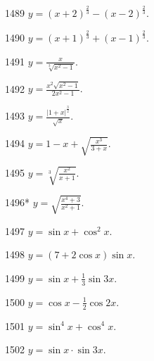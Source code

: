 \begin{prob}[S]{1489}
$y = (x+2)^{\frac{2}{3}} - (x-2)^{\frac{2}{3}}.$
\end{prob}

\begin{prob}[S]{1490}
$y = (x+1)^{\frac{2}{3}} + (x-1)^{\frac{2}{3}}.$
\end{prob}

\begin{prob}[S]{1491}
$y = \frac{x}{\sqrt[3]{x^2 - 1}}.$
\end{prob}

\begin{prob}[S]{1492}
$y = \frac{x^2\sqrt{x^2 - 1}}{2x^2 - 1}.$
\end{prob}

\begin{prob}[S]{1493}
$y = \frac{|1+x|^{\frac{3}{2}}}{\sqrt{x}}.$
\end{prob}

\begin{prob}[S]{1494}
$y = 1 - x + \sqrt{\frac{x^3}{3+x}}.$
\end{prob}

\begin{prob}[S]{1495}
$y = \sqrt[3]{\frac{x^2}{x+1}}.$
\end{prob}

\begin{prob}[S]{1496*}
$y = \sqrt{\frac{x^4 + 3}{x^2 + 1}}.$
\end{prob}

\begin{prob}[S]{1497}
$y = \sin x + \cos^2 x.$
\end{prob}

\begin{prob}[S]{1498}
$y = (7 + 2\cos x)\sin x.$
\end{prob}

\begin{prob}[S]{1499}
$y = \sin x + \frac{1}{3}\sin 3x.$
\end{prob}

\begin{prob}[S]{1500}
$y = \cos x - \frac{1}{2}\cos 2x.$
\end{prob}

\begin{prob}[S]{1501}
$y = \sin^4 x + \cos^4 x.$
\end{prob}

\begin{prob}[S]{1502}
$y = \sin x \cdot \sin 3x.$
\end{prob}

